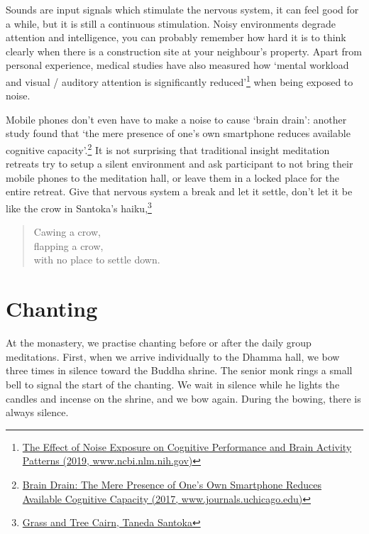 Sounds are input signals which stimulate the nervous system, it can feel
good for a while, but it is still a continuous stimulation. Noisy
environments degrade attention and intelligence, you can probably
remember how hard it is to think clearly when there is a construction
site at your neighbour's property. Apart from personal experience,
medical studies have also measured how `mental workload and visual /
auditory attention is significantly reduced'\footnote{\href{https://www.ncbi.nlm.nih.gov/pmc/articles/PMC6901841/}{The
  Effect of Noise Exposure on Cognitive Performance and Brain Activity
  Patterns (2019, www.ncbi.nlm.nih.gov)}} when being exposed to noise.

Mobile phones don't even have to make a noise to cause `brain drain':
another study found that `the mere presence of one's own smartphone
reduces available cognitive capacity'.\footnote{\href{https://www.journals.uchicago.edu/doi/10.1086/691462}{Brain
  Drain: The Mere Presence of One's Own Smartphone Reduces Available
  Cognitive Capacity (2017, www.journals.uchicago.edu)}} It is not
surprising that traditional insight meditation retreats try to setup a
silent environment and ask participant to not bring their mobile phones
to the meditation hall, or leave them in a locked place for the entire
retreat. Give that nervous system a break and let it settle, don't let
it be like the crow in Santoka's haiku,\footnote{\href{https://www.goodreads.com/book/show/931086.Grass_and_Tree_Cairn}{Grass
  and Tree Cairn, Taneda Santoka}}

\begin{quote}
Cawing a crow,\\
flapping a crow,\\
with no place to settle down.
\end{quote}

\section{Chanting}


At the monastery, we practise chanting before or after the daily group
meditations. First, when we arrive individually to the Dhamma hall, we
bow three times in silence toward the Buddha shrine. The senior monk
rings a small bell to signal the start of the chanting. We wait in
silence while he lights the candles and incense on the shrine, and we
bow again. During the bowing, there is always silence.

